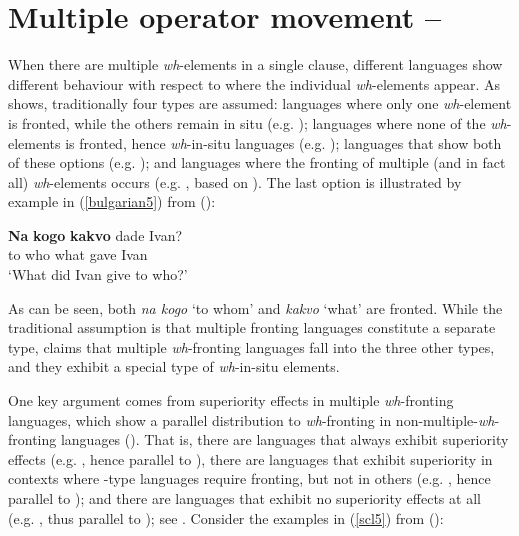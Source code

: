 \section{Multiple operator movement -- \citet{boskovic2002}} \label{sec:5multipleoperator}
When there are multiple \textit{wh}-elements in a single clause, different languages show different behaviour with respect to where the individual \textit{wh}-elements appear. As \citet[352--353]{boskovic2002} shows, traditionally four types are assumed: languages where only one \textit{wh}-element is fronted, while the others remain in situ (e.g. ); languages where none of the \textit{wh}-elements is fronted, hence \textit{wh}-in-situ languages (e.g. ); languages that show both of these options (e.g. ); and languages where the fronting of multiple (and in fact all) \textit{wh}-elements occurs (e.g. , based on \citealt{rudin1988}). The last option is illustrated by example in (\ref{bulgarian5}) from  (\citealt[352, ex. 5]{boskovic2002}):

\ea \gll \textbf{Na} \textbf{kogo} \textbf{kakvo} dade Ivan? \label{bulgarian5}\\
to who what gave Ivan\\
\glt `What did Ivan give to who?'
\z

As can be seen, both \textit{na kogo} `to whom' and \textit{kakvo} `what' are fronted. While the traditional assumption is that multiple fronting languages constitute a separate type, \citet{boskovic2002} claims that multiple \textit{wh}-fronting languages fall into the three other types, and they exhibit a special type of \textit{wh}-in-situ elements.

One key argument comes from superiority effects in multiple \textit{wh}-fronting languages, which show a parallel distribution to \textit{wh}-fronting in non-multiple-\textit{wh}-fronting languages (\citealt[353--357]{boskovic2002}). That is, there are languages that always exhibit superiority effects (e.g. , hence parallel to ), there are languages that exhibit superiority in contexts where -type languages require fronting, but not in others (e.g. , hence parallel to ); and there are languages that exhibit no superiority effects at all (e.g. , thus parallel to ); see \citet[355]{boskovic2002}. Consider the examples in (\ref{scl5}) from  (\citealt[353, exx. 6 and 7]{boskovic2002}):

